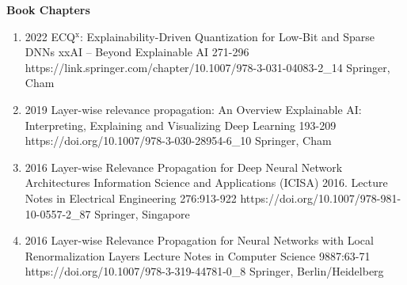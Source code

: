 \documentclass[10pt,a4paper]{article} %
\begin{document}
\headedsection %
{\bf Book Chapters}{}
{
    \begin{enumerate}
        \item {}
                            {2022}
                            {ECQ$^{\textrm{x}}$: Explainability-Driven Quantization for Low-Bit and Sparse DNNs}
                            {xxAI -- Beyond Explainable AI}
                            {271-296}
                            {https://link.springer.com/chapter/10.1007/978-3-031-04083-2_14}
                            {Springer, Cham}

        \item {}
                            {2019}
                            {Layer-wise relevance propagation: An Overview}
                            {Explainable AI: Interpreting, Explaining and Visualizing Deep Learning}
                            {193-209}
                            {https://doi.org/10.1007/978-3-030-28954-6_10}
                            {Springer, Cham}

        \item {}
                            {2016}
                            {Layer-wise Relevance Propagation for Deep Neural Network Architectures}
                            {Information Science and Applications (ICISA) 2016. Lecture Notes in Electrical Engineering}
                            {276:913-922}
                            {https://doi.org/10.1007/978-981-10-0557-2_87}
                            {Springer, Singapore}

        \item {}
                            {2016}
                            {Layer-wise Relevance Propagation for Neural Networks with Local Renormalization Layers}
                            {Lecture Notes in Computer Science}
                            {9887:63-71}
                            {https://doi.org/10.1007/978-3-319-44781-0_8}
                            {Springer, Berlin/Heidelberg}
    \end{enumerate}

}
\end{document}

